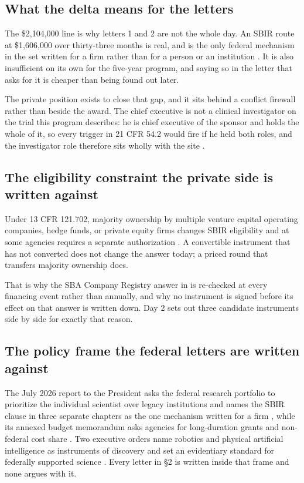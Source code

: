 \subsection{What the delta means for the letters}

The \$2,104,000 line is why letters 1 and 2 are not the whole day. An SBIR route
at \$1,606,000 over thirty-three months is real, and is the only federal
mechanism in the set written for a firm rather than for a person or an
institution \cite{sbapolicydirective}. It is also insufficient on its own for the
five-year program, and saying so in the letter that asks for it is cheaper than
being found out later.

The private position exists to close that gap, and it sits behind a conflict
firewall rather than beside the award. The chief executive is not a clinical
investigator on the trial this program describes: he is chief executive of the
sponsor and holds the whole of it, so every trigger in 21 CFR 54.2 would fire if
he held both roles, and the investigator role therefore sits wholly with the site
\cite{ecfr2026part54,fdafindisclosure2013}.

\subsection{The eligibility constraint the private side is written against}

Under 13 CFR 121.702, majority ownership by multiple venture capital operating
companies, hedge funds, or private equity firms changes SBIR eligibility and at
some agencies requires a separate authorization \cite{ecfr2026sbirownership}. A
convertible instrument that has not converted does not change the answer today; a
priced round that transfers majority ownership does.

That is why the SBA Company Registry answer in
 is re-checked at every financing event
rather than annually, and why no instrument is signed before its effect on that
answer is written down. Day 2 sets out three candidate instruments side by side
for exactly that reason.

\subsection{The policy frame the federal letters are written against}

The July 2026 report to the President asks the federal research portfolio to
prioritize the individual scientist over legacy institutions and names the SBIR
clause in three separate chapters as the one mechanism written for a firm
\cite{kratsios2026sciencegoldenage}, while its annexed budget memorandum asks
agencies for long-duration grants and non-federal cost share
\cite{kratsiosvought2026fy2028priorities}. Two executive orders name robotics and
physical artificial intelligence as instruments of discovery and set an
evidentiary standard for federally supported science
\cite{eo14363genesismission,eo14303goldstandard}. Every letter in \S2 is written
inside that frame and none argues with it.
